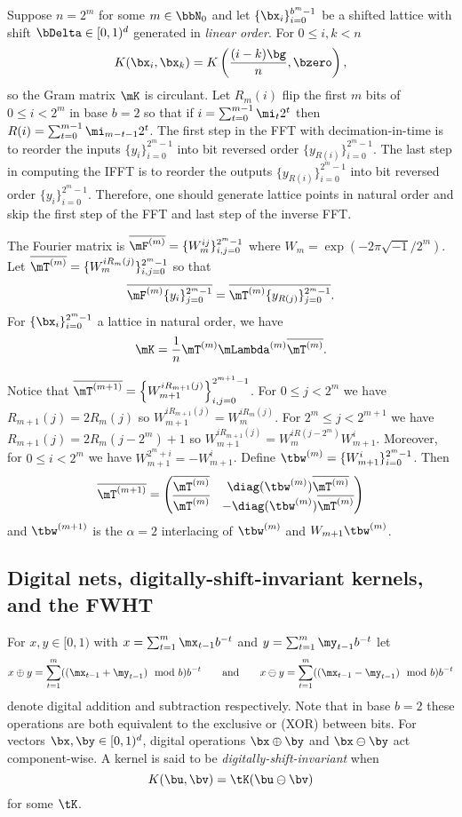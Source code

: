 \documentclass[acmsmall]{acmart}
\begin{document}
Suppose $n=2^m$ for some $m \in \bbN_0$ and let $\{\bx_i\}_{i=0}^{b^m-1}$ be a shifted lattice with shift $\bDelta \in [0,1)^d$ generated in \emph{linear order}. For $0 \leq i,k < n$
$$K(\bx_i,\bx_k) = K\left(\frac{(i-k) \bg}{n},\bzero\right),$$ 
so the Gram matrix $\mK$ is circulant. Let $R_m(i)$ flip the first $m$ bits of $0 \leq i < 2^m$ in base $b=2$ so that if $i=\sum_{t=0}^{m-1} \mi_t 2^t$ then $R(i) = \sum_{t=0}^{m-1} \mi_{m-t-1} 2^t$. The first step in the FFT with decimation-in-time is to reorder the inputs $\{y_i\}_{i=0}^{2^m-1}$ into bit reversed order $\{y_{R(i)}\}_{i=0}^{2^m-1}$. The last step in computing the IFFT is to reorder the outputs $\{y_{R(i)}\}_{i=0}^{2^m-1}$ into bit reversed order $\{y_i\}_{i=0}^{2^m-1}$. Therefore, one should generate lattice points in natural order and skip the first step of the FFT and last step of the inverse FFT. 

The Fourier matrix is $\overline{\mF^{(m)}} = \{W_m^{ij}\}_{i,j=0}^{2^m-1}$ where $W_m = \exp(-2 \pi \sqrt{-1}/2^m)$. Let $\overline{\mT^{(m)}} = \{W_m^{iR_m(j)}\}_{i,j=0}^{2^m-1}$ so that  
$$\overline{\mF^{(m)} \{y_i\}_{j=0}^{2^m-1}} = \overline{\mT^{(m)} \{y_{R(j)}\}_{j=0}^{2^m-1}}.$$
For $\{\bx_i\}_{i=0}^{2^m-1}$ a lattice in natural order, we have 
$$\mK = \frac{1}{n} \mT^{(m)} \mLambda^{(m)} \overline{\mT^{(m)}}.$$

Notice that $\overline{\mT^{(m+1)}} = \left\{W_{m+1}^{i R_{m+1}(j)}\right\}_{i,j=0}^{2^{m+1}-1}$. For $0 \leq j < 2^m$ we have $R_{m+1}(j) = 2 R_m(j)$ so $W^{i R_{m+1}(j)}_{m+1}= W^{i R_m(j)}_m$. For $2^m \leq j < 2^{m+1}$ we have $R_{m+1}(j) = 2R_m(j-2^m)+1$ so $W^{i R_{m+1}(j)}_{m+1} = W_m^{i R(j-2^m)} W_{m+1}^i$. Moreover, for $0 \leq i < 2^m$ we have $W_{m+1}^{2^m+i} = -W_{m+1}^i$. Define $\tbw^{(m)} = \{W_{m+1}^i\}_{i=0}^{2^m-1}$. Then 
$$\overline{\mT^{(m+1)}} = \begin{pmatrix} \overline{\mT^{(m)}} & \diag(\tbw^{(m)}) \overline{\mT^{(m)}} \\ \overline{\mT^{(m)}} & - \diag(\tbw^{(m)}) \overline{\mT^{(m)}} \end{pmatrix}$$
and $\tbw^{(m+1)}$ is the $\alpha=2$ interlacing of $\tbw^{(m)}$ and $W_{m+1} \tbw^{(m)}$. 

\subsection{Digital nets, digitally-shift-invariant kernels, and the FWHT} \label{subsec:DSI_kernels}

For $x,y \in [0,1)$ with $x = \sum_{t=1}^{m} \mx_{t-1} b^{-t}$ and $y = \sum_{t=1}^m \my_{t-1} b^{-t}$ let 
$$x \oplus y = \sum_{t=1}^m ((\mx_{t-1} + \my_{t-1}) \mod b) b^{-t} \qquad\text{and}\qquad x \ominus y = \sum_{t=1}^m ((\mx_{t-1} - \my_{t-1}) \mod b) b^{-t}$$
denote digital addition and subtraction respectively. Note that in base $b=2$ these operations are both equivalent to the exclusive or (XOR) between bits.  For vectors $\bx,\by \in [0,1)^d$, digital operations $\bx \oplus \by$ and  $\bx \ominus \by$ act component-wise. 
A kernel is said to be \emph{digitally-shift-invariant} when 
$$K(\bu, \bv) = \tK(\bu \ominus \bv)$$
for some $\tK$. 
\end{document}
